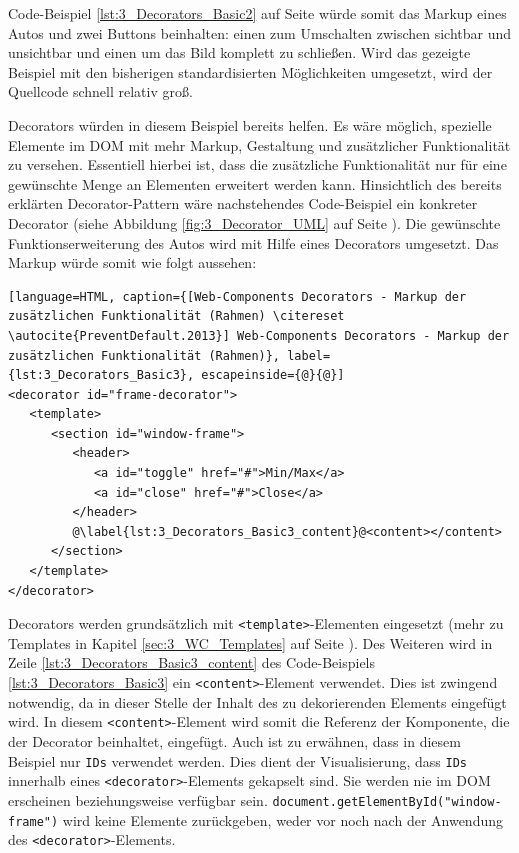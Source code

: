 Code-Beispiel \ref{lst:3_Decorators_Basic2} auf Seite \pageref{lst:3_Decorators_Basic2} würde somit das Markup eines Autos und zwei Buttons beinhalten: einen zum Umschalten zwischen sichtbar und unsichtbar und einen um das Bild komplett zu schließen.
Wird das gezeigte Beispiel mit den bisherigen standardisierten Möglichkeiten umgesetzt, wird der Quellcode schnell relativ groß.

Decorators würden in diesem Beispiel bereits helfen. Es wäre möglich, spezielle Elemente im DOM mit mehr Markup, Gestaltung und zusätzlicher Funktionalität zu versehen. Essentiell hierbei ist, dass die zusätzliche Funktionalität nur für eine gewünschte Menge an Elementen erweitert werden kann. Hinsichtlich des bereits erklärten Decorator-Pattern wäre nachstehendes Code-Beispiel ein konkreter Decorator (siehe Abbildung \ref{fig:3_Decorator_UML} auf Seite \pageref{fig:3_Decorator_UML}). Die gewünschte Funktionserweiterung des Autos wird mit Hilfe eines Decorators umgesetzt. Das Markup würde somit wie folgt aussehen:

\begin{lstlisting}[language=HTML, caption={[Web-Components Decorators - Markup der zusätzlichen Funktionalität (Rahmen) \citereset \autocite{PreventDefault.2013}] Web-Components Decorators - Markup der zusätzlichen Funktionalität (Rahmen)}, label={lst:3_Decorators_Basic3}, escapeinside={@}{@}]
<decorator id="frame-decorator">
   <template>
      <section id="window-frame">
         <header>
            <a id="toggle" href="#">Min/Max</a>
            <a id="close" href="#">Close</a>
         </header>
         @\label{lst:3_Decorators_Basic3_content}@<content></content>
      </section>
   </template>
</decorator>
\end{lstlisting}

Decorators werden grundsätzlich mit \lstinline|<template>|-Elementen eingesetzt (mehr zu Templates in Kapitel \ref{sec:3_WC_Templates} auf Seite \pageref{sec:3_WC_Templates}). Des Weiteren wird in Zeile \ref{lst:3_Decorators_Basic3_content} des Code-Beispiels \ref{lst:3_Decorators_Basic3} ein \lstinline|<content>|-Element verwendet. Dies ist zwingend notwendig, da in dieser Stelle der Inhalt des zu dekorierenden Elements eingefügt wird. In diesem \lstinline|<content>|-Element wird somit die Referenz der Komponente, die der Decorator beinhaltet, eingefügt.
Auch ist zu erwähnen, dass in diesem Beispiel nur \lstinline|IDs| verwendet werden. Dies dient der Visualisierung, dass \lstinline|IDs| innerhalb eines \lstinline|<decorator>|-Elements gekapselt sind. Sie werden nie im DOM erscheinen beziehungsweise verfügbar sein. \lstinline|document.getElementById("window-frame")| wird keine Elemente zurückgeben, weder vor noch nach der Anwendung des \lstinline|<decorator>|-Elements.

